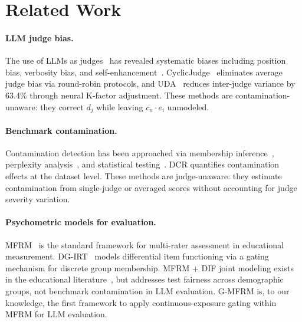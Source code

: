 \documentclass[11pt]{article}
\newcommand{\gmfrm}{\textsc{G-MFRM}}
\newcommand{\ei}{e_i}
\newcommand{\cn}{c_n}
\newcommand{\djud}{d_j}
\begin{document}
\section{Related Work}

\paragraph{LLM judge bias.} The use of LLMs as judges~\citep{zheng2023judging} has revealed systematic biases including position bias, verbosity bias, and self-enhancement~\citep{raina2024preferenceleakage}. CyclicJudge~\citep{li2024cyclicjudge} eliminates average judge bias via round-robin protocols, and UDA~\citep{wu2024uda} reduces inter-judge variance by 63.4\% through neural K-factor adjustment. These methods are contamination-unaware: they correct $\djud$ while leaving $\cn \cdot \ei$ unmodeled.

\paragraph{Benchmark contamination.} Contamination detection has been approached via membership inference~\citep{golchin2023contamination}, perplexity analysis~\citep{shi2023minKpct}, and statistical testing~\citep{dekoninck2024constat}. DCR quantifies contamination effects at the dataset level. These methods are judge-unaware: they estimate contamination from single-judge or averaged scores without accounting for judge severity variation.

\paragraph{Psychometric models for evaluation.} MFRM~\citep{linacre1989mfrm,eckes2011introduction} is the standard framework for multi-rater assessment in educational measurement. DG-IRT~\citep{shu2013psychometrika} models differential item functioning via a gating mechanism for discrete group membership. MFRM + DIF joint modeling exists in the educational literature~\citep{wind2018differential,patz2002irt,fox2001bayesian}, but addresses test fairness across demographic groups, not benchmark contamination in LLM evaluation. \gmfrm{} is, to our knowledge, the first framework to apply continuous-exposure gating within MFRM for LLM evaluation.
\end{document}
